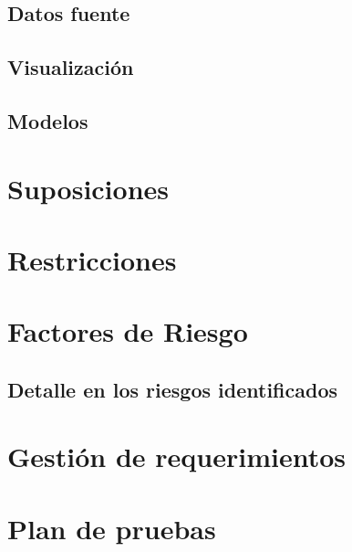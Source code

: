 \Blindtext[2]

\subsection{Datos fuente}
\label{subsection:retos:datos}

\Blindtext[7]

\subsection{Visualización}
\label{subsection:retos:viz}

\Blindtext[1]

\subsection{Modelos}
\label{subsection:retos:modelos}

\Blindtext[1]

\section{Suposiciones}
\label{section:suposiciones}

\Blindtext[1]

\section{Restricciones}
\label{section:restricciones}

\Blindtext[1]

\section{Factores de Riesgo}
\label{section:riesgos}

\Blindtext[1]

\subsection{Detalle en los riesgos identificados}
\label{subsection:riesgos:detalle}

\Blindtext[1]

\section{Gestión de requerimientos}
\label{section:gestion}

\Blindtext[1]

\section{Plan de pruebas}
\label{section:plan-pruebas}

